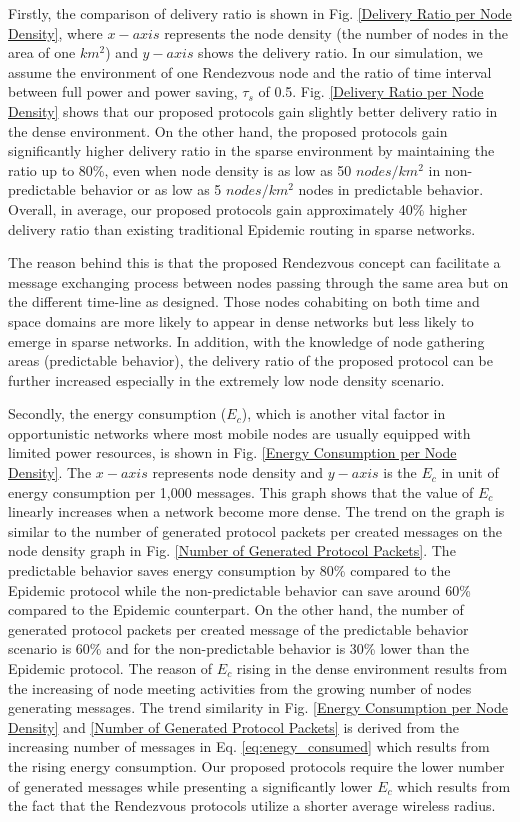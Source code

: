 \documentclass[conference]{IEEEtran}
\begin{document}
Firstly, the comparison of delivery ratio is shown in Fig. \ref{Delivery Ratio per Node Density}, where $x-axis$ represents the node density (the number of nodes in the area of one $km^2$) and $y-axis$ shows the delivery ratio.
%
In our simulation, we assume the environment of one Rendezvous node and the ratio of time interval between full power and power saving, $\tau_s$ of 0.5.
%
Fig. \ref{Delivery Ratio per Node Density} shows that our proposed protocols gain slightly better delivery ratio in the dense environment.
%
On the other hand, the proposed protocols gain significantly higher delivery ratio in the sparse environment by maintaining the ratio up to 80\%, even when node density is as low as 50 $nodes/km^2$ in non-predictable behavior or as low as 5 $nodes/km^2$ nodes in predictable behavior.
%
Overall, in average, our proposed protocols gain approximately 40\% higher delivery ratio than existing traditional Epidemic routing in sparse networks.

The reason behind this is that the proposed Rendezvous concept can facilitate a message exchanging process between nodes passing through the same area but on the different time-line as designed.
Those nodes cohabiting on both time and space domains are more likely to appear in dense networks but less likely to emerge in sparse networks.
In addition, with the knowledge of node gathering areas (predictable behavior), the delivery ratio of the proposed protocol can be further increased especially in the extremely low node density scenario. 

Secondly, the energy consumption ($E_c$), which is another vital factor in opportunistic networks where most mobile nodes are usually equipped with limited power resources, is shown in Fig. \ref{Energy Consumption per Node Density}.
The $x-axis$ represents node density and $y-axis$ is the $E_c$ in unit of energy consumption per 1,000 messages.
This graph shows that the value of $E_c$ linearly increases when a network become more dense.
The trend on the graph is similar to the number of generated protocol packets per created messages on the node density graph in Fig. \ref{Number of Generated Protocol Packets}.
The predictable behavior saves energy consumption by 80\% compared to the Epidemic protocol while the non-predictable behavior can save around 60\% compared to the Epidemic counterpart.
On the other hand, the number of generated protocol packets per created message of the predictable behavior scenario is 60\% and for the non-predictable behavior is 30\% lower than the Epidemic protocol.
The reason of $E_c$ rising in the dense environment results from the increasing of node meeting activities from the growing number of nodes generating messages.
%
The trend similarity in Fig. \ref{Energy Consumption per Node Density} and \ref{Number of Generated Protocol Packets} is derived from the increasing number of messages in Eq. \ref{eq:enegy_consumed} which results from the rising energy consumption. 
Our proposed protocols require the lower number of generated messages while presenting a significantly lower $E_c$ which results from the fact that the Rendezvous protocols utilize a shorter average wireless radius.
\end{document}
